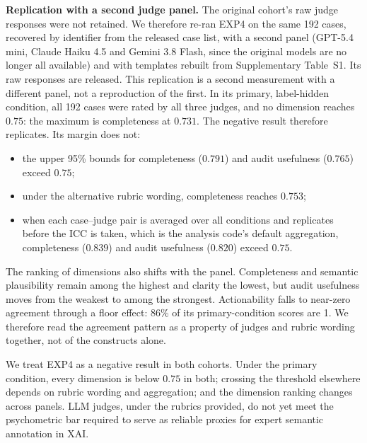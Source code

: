 \documentclass[10pt]{article}
\begin{document}
\textbf{Replication with a second judge panel.} The original cohort's raw
judge responses were not retained. We therefore re-ran EXP4 on the same 192
cases, recovered by identifier from the released case list, with a second
panel (GPT-5.4 mini, Claude Haiku 4.5 and Gemini 3.8 Flash, since the
original models are no longer all available) and with templates rebuilt from
Supplementary Table~S1. Its raw responses are released. This replication is a
second measurement with a different panel, not a reproduction of the first.
In its primary, label-hidden condition, all 192 cases were rated by all three
judges, and no dimension reaches $0.75$: the maximum is completeness at
$0.731$. The negative result therefore replicates. Its margin does not:
\begin{itemize}
\item the upper 95\% bounds for completeness ($0.791$) and audit usefulness
  ($0.765$) exceed $0.75$;
\item under the alternative rubric wording, completeness reaches $0.753$;
\item when each case--judge pair is averaged over all conditions and
  replicates before the ICC is taken, which is the analysis code's default
  aggregation, completeness ($0.839$) and audit usefulness ($0.820$) exceed
  $0.75$.
\end{itemize}
The ranking of dimensions also shifts with the panel. Completeness and semantic
plausibility remain among the highest and clarity the lowest, but audit
usefulness moves from the weakest to among the strongest. Actionability falls
to near-zero agreement through a floor effect: 86\% of its primary-condition
scores are 1. We therefore read the agreement pattern as a property of judges and rubric
wording together, not of the constructs alone.

We treat EXP4 as a negative result in both cohorts. Under the primary
condition, every dimension is below $0.75$ in both; crossing the threshold
elsewhere depends on rubric wording and aggregation; and the dimension
ranking changes across panels. LLM judges, under the rubrics provided, do not
yet meet the psychometric bar required to serve as reliable proxies for
expert semantic annotation in XAI.
\end{document}
